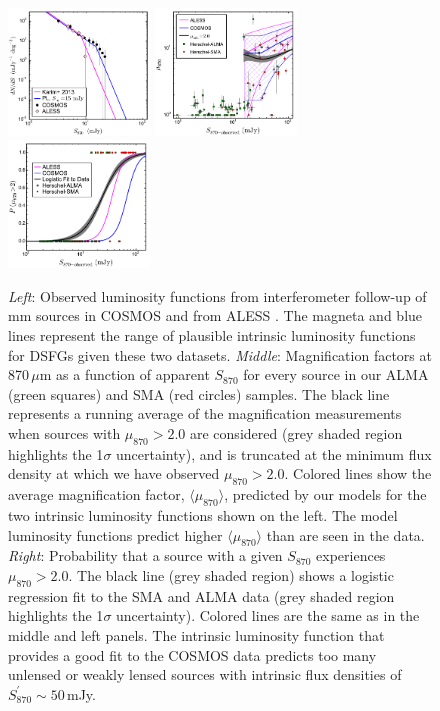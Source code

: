 \documentclass[iop]{emulateapj}
\begin{document}
\begin{figure}[!tbp] 
\includegraphics[width=0.335\textwidth]{../Figures/DifferentialNumberCounts.pdf}
\includegraphics[width=0.335\textwidth]{../Figures/s870_mu_z1p5.pdf}
\includegraphics[width=0.335\textwidth]{../Figures/Pmu_S870_z1p5.pdf}

\caption{ {\it Left}: Observed luminosity functions from interferometer
follow-up of mm sources in COSMOS \citep[black circles;][]{Younger:2007fk,
Younger:2009lr, Miettinen:2015lr} and from ALESS \citep[pink
diamonds;][]{Karim:2013lr}.  The magneta and blue lines represent the range of
plausible intrinsic luminosity functions for DSFGs given these two datasets.
{\it Middle}: Magnification factors at 870$\,\mu$m as a function of apparent
$S_{870}$ for every source in our ALMA (green squares) and SMA (red circles)
samples.  The black line represents a running average of the magnification
measurements when sources with $\mu_{870} > 2.0$ are considered (grey shaded
region highlights the 1$\sigma$ uncertainty), and is truncated at the minimum
flux density at which we have observed $\mu_{870} > 2.0$.  Colored lines show
the average magnification factor, $\langle\mu_{870}\rangle$, predicted by our
models for the two intrinsic luminosity functions shown on the left.  The model
luminosity functions predict higher $\langle\mu_{870}\rangle$ than are seen in
the data.  {\it Right}: Probability that a source with a given $S_{870}$
experiences $\mu_{870} > 2.0$.  The black line (grey shaded region) shows a
logistic regression fit to the SMA and ALMA data (grey shaded region highlights
the 1$\sigma$ uncertainty).  Colored lines are the same as in the middle and
left panels.  The intrinsic luminosity function that provides a good fit to the
COSMOS data predicts too many unlensed or weakly lensed sources with intrinsic
flux densities of $S_{870}^\prime \sim 50\,$mJy.} \label{fig:lensstats}

\end{figure}
\end{document}

